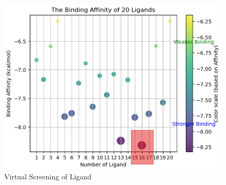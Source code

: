 \documentclass{report}
\begin{document}
\begin{figure}
    \centering
    \includegraphics[width=1\linewidth]{../Figures/Virtual Screen.png}
    \caption{Virtual Screening of Ligand}
    \label{Virtual Screening of Ligand}
\end{figure}
\end{document}
